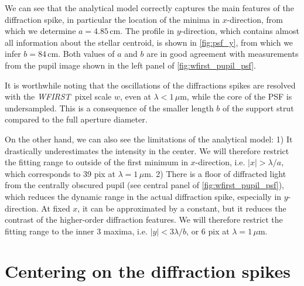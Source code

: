 \documentclass[modern, times]{aastex61}
\newcommand\wfirst{\textit{WFIRST}}
\begin{document}
We can see that the analytical model correctly captures the main features of the diffraction spike, in particular the location of the minima in $x$-direction, from which we determine $a=4.85$\,cm.
The profile in $y$-direction, which contains almost all information about the stellar centroid, is shown in \autoref{fig:psf_y}, from which we infer $b=84$\,cm.
Both values of $a$ and $b$ are in good agreement with measurements from the pupil image shown in the left panel of \autoref{fig:wfirst_pupil_psf}.

It is worthwhile noting that the oscillations of the diffractions spikes are resolved with the \wfirst\ pixel scale $w$, even at $\lambda<1\,\mu$m, while the core of the PSF is undersampled.
This is a consequence of the smaller length $b$ of the support strut compared to the full aperture diameter.

On the other hand, we can also see the limitations of the analytical model: 1) It drastically underestimates the intensity in the center. 
We will therefore restrict the fitting range to outside of the first minimum in $x$-direction, i.e. $|x| > \lambda\big/a$, which corresponds to 39 pix at $\lambda=1\,\mu$m.
2) There is a floor of diffracted light from the centrally obscured pupil (see central panel of \autoref{fig:wfirst_pupil_psf}), which reduces the  dynamic range in the actual diffraction spike, especially in $y$-direction.
At fixed $x$, it can be approximated by a constant, but it reduces the contrast of the higher-order diffraction features.
We will therefore restrict the fitting range to the inner 3 maxima, i.e. $|y| < 3 \lambda\big/b$, or $6$ pix at $\lambda=1\,\mu$m.


\section{Centering on the diffraction spikes}
\label{sec:fitting}
\end{document}
